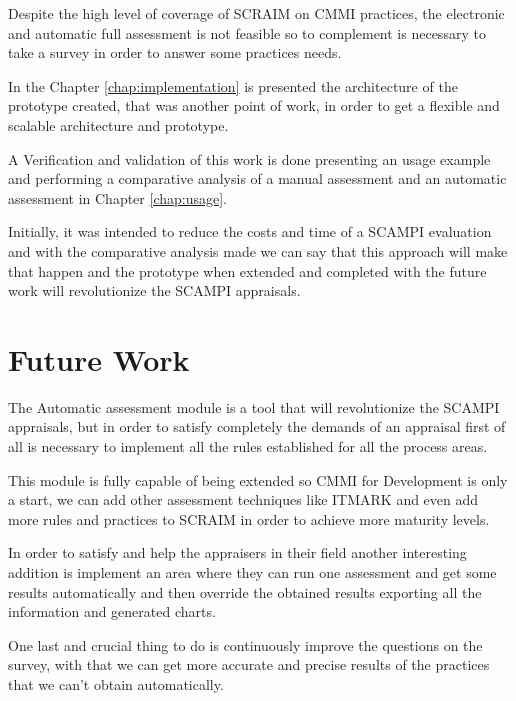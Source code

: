 Despite the high level of coverage of SCRAIM on CMMI practices, the electronic and automatic full assessment is not feasible so to complement is necessary to take a survey in order to answer some practices needs. 

In the Chapter \ref{chap:implementation} is presented the architecture of the prototype created, that was another point of work, in order to get a flexible and scalable architecture and prototype.

A Verification and validation of this work is done presenting an usage example and performing a comparative analysis of a manual assessment and an automatic assessment in Chapter \ref{chap:usage}. 

Initially, it was intended to reduce the costs and time of a SCAMPI evaluation and with the comparative analysis made we can say that this approach will make that happen and the prototype when extended and completed with the future work will revolutionize the SCAMPI appraisals.

\section{Future Work}\label{futurework}

The Automatic assessment module is a tool that will revolutionize the SCAMPI appraisals, but in order to satisfy completely the demands of an appraisal first of all is necessary to implement all the rules established for all the process areas.

This module is fully capable of being extended so CMMI for Development is only a start, we can add other assessment techniques like ITMARK and even add more rules and practices to SCRAIM in order to achieve more maturity levels.

In order to satisfy and help the appraisers in their field another interesting addition is implement an area where they can run one assessment and get some results automatically and then override the obtained results exporting all the information and generated charts.

One last and crucial thing to do is continuously improve the questions on the survey, with that we can get more accurate and precise results of the practices that we can't obtain automatically. 